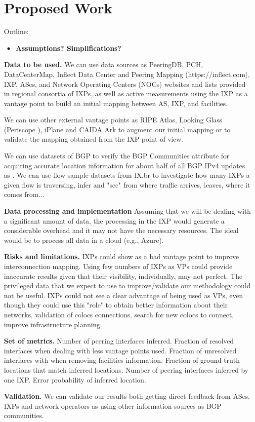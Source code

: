 \chapter{Proposed Work}\label{cap:proposal}
\thispagestyle{empty}

	Outline:
	\begin{itemize}
	  \item \textbf{Assumptions? Simplifications?}

	\end{itemize} 

	\textbf{Data to be used.} We can use data sources as PeeringDB, PCH, DataCenterMap, Inflect Data Center and Peering Mapping (https://inflect.com), IXP, ASes, and Network Operating Centers (NOCs) websites and lists provided in regional consortia of IXPs, as well as active measurements using the IXP as a vantage point to build an initial mapping between AS, IXP, and facilities. 

	We can use other external vantage points as RIPE Atlas, Looking Glass (Periscope \cite{Periscope}), iPlane and CAIDA Ark to augment our initial mapping or to validate the mapping obtained from the IXP point of view.

	We can use datasets of BGP to verify the BGP Communities attribute
	for acquiring accurate location information for about half of all BGP IPv4 updates as \cite{Giotsas:2017:DPI:3098822.3098855}. We can use flow sample datasets from IX.br to investigate how many IXPs a given flow is traversing, infer and "see" from where traffic arrives,  leaves,  where it comes from...


	\textbf{Data processing and implementation} Assuming that we will be dealing with a significant amount of data, the processing in the IXP would generate a considerable overhead and it may not have the necessary resources. The ideal would be to process all data in a cloud (e.g., Azure).

	\textbf{Risks and limitations.} IXPs could show as a bad vantage point to improve interconnection mapping. Using few numbers of IXPs as VPs could provide inaccurate results given that their visibility, individually, may not perfect. The privileged data that we expect to use to improve/validate our methodology could not be useful. IXPs could not see a clear advantage of being used as VPs, even though they could use this "role" to obtain better information about their networks, validation of colocs connections, search for new colocs to connect, improve infrastructure planning.

	\textbf{Set of metrics.} Number of peering interfaces inferred. Fraction of resolved interfaces when dealing with less vantage points used. Fraction of unresolved interfaces with when removing facilities information. Fraction of ground truth locations that match inferred locations. Number of peering interfaces inferred by one IXP. Error probability of inferred location.

	\textbf{Validation.} We can validate our results both getting direct feedback from ASes, IXPs and network operators as using other information sources as BGP communities.
